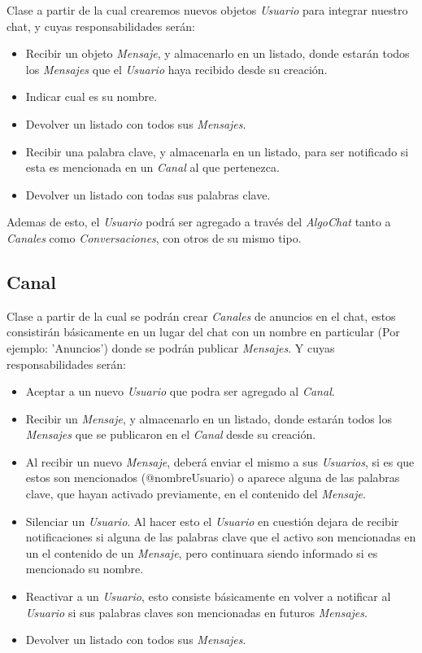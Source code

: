 \documentclass[titlepage,a4paper]{article}
\begin{document}
Clase a partir de la cual crearemos nuevos objetos \textit{Usuario} para integrar nuestro chat, y cuyas responsabilidades serán:

\begin{itemize}
	\item Recibir un objeto \textit{Mensaje}, y almacenarlo en un listado, donde estarán todos los \textit{Mensajes} que el \textit{Usuario} haya recibido desde su creación.
	\item Indicar cual es su nombre.
	\item Devolver un listado con todos sus \textit{Mensajes}.
	\item Recibir una palabra clave, y almacenarla en un listado, para ser notificado si esta es mencionada en un \textit{Canal} al que pertenezca.
	\item Devolver un listado con todas sus palabras clave. 
\end{itemize}

Ademas de esto, el \textit{Usuario} podrá ser agregado a través del \textit{AlgoChat} tanto a \textit{Canales} como \textit{Conversaciones}, con otros de su mismo tipo.

\subsection{Canal}\label{subsec:canal}

Clase a partir de la cual se podrán crear \textit{Canales} de anuncios en el chat, estos consistirán básicamente en un lugar del chat con un nombre en particular (Por ejemplo: 'Anuncios') donde se podrán publicar \textit{Mensajes}. Y cuyas responsabilidades serán:

\begin{itemize}
	\item Aceptar a un nuevo \textit{Usuario} que podra ser agregado al \textit{Canal}.
	\item Recibir un \textit{Mensaje}, y almacenarlo en un listado, donde estarán todos los \textit{Mensajes} que se publicaron en el \textit{Canal} desde su creación.
	\item Al recibir un nuevo \textit{Mensaje}, deberá enviar el mismo a sus \textit{Usuarios}, si es que estos son mencionados (@nombreUsuario) o aparece alguna de las palabras clave, que hayan activado previamente, en el contenido del \textit{Mensaje}.
	\item Silenciar un \textit{Usuario}. Al hacer esto el \textit{Usuario} en cuestión dejara de recibir notificaciones si alguna de las palabras clave que el activo son mencionadas en un el contenido de un \textit{Mensaje}, pero continuara siendo informado si es mencionado su nombre.
	\item Reactivar a un \textit{Usuario}, esto consiste básicamente en volver a notificar al \textit{Usuario} si sus palabras claves son mencionadas en futuros \textit{Mensajes}.
	\item Devolver un listado con todos sus \textit{Mensajes}.
\end{itemize}
\end{document}
